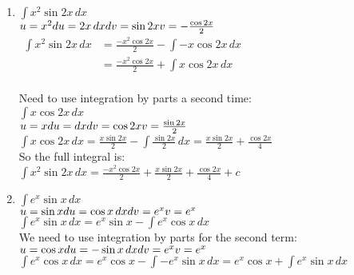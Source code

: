\documentclass[../main.tex]{subfiles}
\begin{document}
\begin{enumerate}
    \item \(\int x^2 \sin{2x} \, dx\)\\
    \(u=x^2\\
    du=2x\,dx\\
    dv=\sin{2x}\\
    v=-\frac{\cos{2x}}{2}\)\\
    $
    \!
    \begin{aligned}
        \int x^2 \sin{2x} \, dx
        &=\frac{-x^2\cos{2x}}{2}-\int -x\cos{2x}\, dx\\
        &=\frac{-x^2\cos{2x}}{2}+\int x\cos{2x}\, dx\\
    \end{aligned}
    $
    
    Need to use integration by parts a second time:\\
    \(\int x\cos{2x}\, dx\)\\
    \(u=x\\
    du=dx\\
    dv=\cos{2x}\\
    v=\frac{\sin{2x}}{2}\)\\
    \(\int x\cos{2x}\, dx=\frac{x\sin{2x}}{2}-\int \frac{\sin{2x}}{2}\,dx=\frac{x\sin{2x}}{2}+\frac{\cos{2x}}{4}\)\\

    So the full integral is:\\
    \(\int x^2 \sin{2x} \, dx=\frac{-x^2\cos{2x}}{2}+\frac{x\sin{2x}}{2}+\frac{\cos{2x}}{4}+c\)\\
    
    \item \(\int e^x \sin{x}\, dx\)\\
    \(u=\sin{x}\\
    du=\cos{x}\,dx\\
    dv=e^x\\
    v=e^x\)\\
    \(\int e^x \sin{x}\, dx=e^x\sin{x}-\int e^x\cos{x}\,dx\)\\

    We need to use integration by parts for the second term:\\
    \(u=\cos{x}\\
    du=-\sin{x}\,dx\\
    dv=e^x\\
    v=e^x\)\\
    \(\int e^x\cos{x}\,dx=e^x\cos{x}-\int -e^x\sin{x}\,dx=e^x\cos{x}+\int e^x\sin{x}\, dx\)\\


\end{enumerate}
\end{document}
